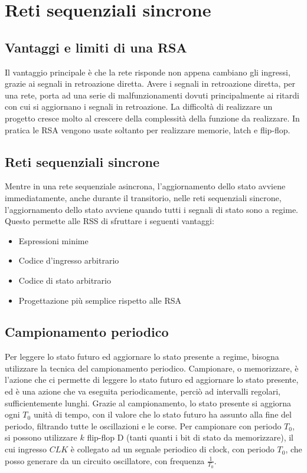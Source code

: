 \documentclass{subfiles}
\begin{document}
\section{Reti sequenziali sincrone}

\subsection{Vantaggi e limiti di una RSA}

Il vantaggio principale è che la rete risponde non appena cambiano gli ingressi, grazie ai segnali in retroazione diretta.
Avere i segnali in retroazione diretta, per una rete, porta ad una serie di malfunzionamenti dovuti principalmente ai ritardi con cui si aggiornano i segnali in retroazione.
La difficoltà di realizzare un progetto cresce molto al crescere della complessità della funzione da realizzare.
In pratica le RSA vengono usate soltanto per realizzare memorie, latch e flip-flop.

\subsection{Reti sequenziali sincrone}

Mentre in una rete sequenziale asincrona, l'aggiornamento dello stato avviene immediatamente, anche durante il transitorio, nelle reti sequenziali sincrone, l'aggiornamento dello stato avviene quando tutti i segnali di stato sono a regime.
Questo permette alle RSS di sfruttare i seguenti vantaggi:

\begin{itemize}
    \item Espressioni minime
    \item Codice d'ingresso arbitrario
    \item Codice di stato arbitrario
    \item Progettazione più semplice rispetto alle RSA
\end{itemize}

\subsection{Campionamento periodico}

Per leggere lo stato futuro ed aggiornare lo stato presente a regime, bisogna utilizzare la tecnica del campionamento periodico.
Campionare, o memorizzare, è l'azione che ci permette di leggere lo stato futuro ed aggiornare lo stato presente, ed è una azione che va eseguita periodicamente, perciò ad intervalli regolari, sufficientemente lunghi.
Grazie al campionamento, lo stato presente si aggiorna ogni $T_0$ unità di tempo, con il valore che lo stato futuro ha assunto alla fine del periodo, filtrando tutte le oscillazioni e le corse.
Per campionare con periodo $T_0$, si possono utilizzare $k$ flip-flop D (tanti quanti i bit di stato da memorizzare), il cui ingresso $CLK$ è collegato ad un segnale periodico di clock, con periodo $T_0$, che posso generare da un circuito oscillatore, con frequenza $\frac{1}{T_0}$.
\end{document}
